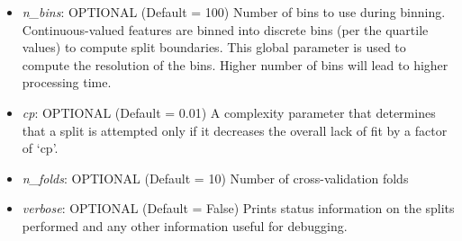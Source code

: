 \begin{itemize}
    \item \emph{n\_bins}: OPTIONAL (Default = 100) Number of bins to use during binning.
    Continuous-valued features are binned into discrete bins (per the quartile values)
    to compute split boundaries. This global parameter is used to compute the resolution of the bins. Higher number of bins will lead to higher processing time.
    \item \emph{cp}: OPTIONAL (Default = 0.01)
        A complexity parameter that determines that a split is attempted only if it
        decreases the overall lack of fit by a factor of `cp'.
    \item \emph{n\_folds}: OPTIONAL (Default = 10) Number of cross-validation folds
    \item \emph{verbose}: OPTIONAL (Default = False) Prints status information
     on the splits performed and any other information useful for debugging.
\end{itemize}

